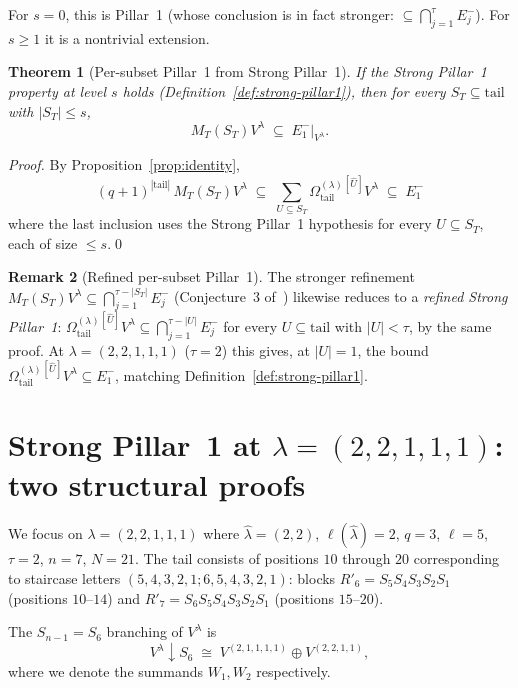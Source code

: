 \documentclass[11pt]{article}
\newtheorem{theorem}{Theorem}
\theoremstyle{definition}
\newtheorem{remark}[theorem]{Remark}
\newcommand{\Vlam}{V^\lambda}
\newcommand{\Om}{\Omega}
\newcommand{\Omtail}{\Om^{(\lambda)}_{\mathrm{tail}}}
\newcommand{\hatl}{\widehat\lambda}
\newcommand{\elh}{\ell(\hatl)}
\newcommand{\Rp}{R'}
\newcommand{\Eminus}[1]{E^-_{#1}}
\begin{document}
For $s = 0$, this is Pillar~1 (whose conclusion is in fact stronger:
$\subseteq \bigcap_{j=1}^\tau \Eminus j$). For $s \ge 1$ it is a
nontrivial extension.

\begin{theorem}[Per-subset Pillar~1 from Strong Pillar~1]\label{thm:per-subset-from-strong}
If the Strong Pillar~1 property at level $s$ holds (Definition~\ref{def:strong-pillar1}),
then for every $S_T \subseteq \mathrm{tail}$ with $|S_T| \le s$,
\[
   M_T(S_T) \Vlam \;\subseteq\; \Eminus 1|_{\Vlam}.
\]
\end{theorem}

\begin{proof}
By Proposition~\ref{prop:identity},
\[
   (q+1)^{|\mathrm{tail}|}\, M_T(S_T) \Vlam
   \;\subseteq\; \sum_{U \subseteq S_T} \Omtail^{[\widehat U]} \Vlam
   \;\subseteq\; \Eminus 1
\]
where the last inclusion uses the Strong Pillar~1 hypothesis for every
$U \subseteq S_T$, each of size $\le s$.\qed
\end{proof}

\begin{remark}[Refined per-subset Pillar~1]\label{rem:refined}
The stronger refinement
$M_T(S_T) \Vlam \subseteq \bigcap_{j=1}^{\tau-|S_T|}\Eminus j$
(Conjecture~3 of~\cite{strong}) likewise reduces to a \emph{refined Strong Pillar~1}:
$\Omtail^{[\widehat U]} \Vlam \subseteq \bigcap_{j=1}^{\tau-|U|}\Eminus j$
for every $U \subseteq \mathrm{tail}$ with $|U| < \tau$, by the same proof.
At $\lambda = (2,2,1,1,1)$ ($\tau = 2$) this gives, at $|U| = 1$, the bound
$\Omtail^{[\widehat U]} \Vlam \subseteq \Eminus 1$, matching
Definition~\ref{def:strong-pillar1}.
\end{remark}

\section{Strong Pillar~1 at $\lambda = (2,2,1,1,1)$: two structural proofs}
\label{sec:structural}

We focus on $\lambda = (2,2,1,1,1)$ where $\hatl = (2,2)$, $\elh = 2$, $q = 3$,
$\ell = 5$, $\tau = 2$, $n = 7$, $N = 21$. The tail consists of positions
$10$ through $20$ corresponding to staircase letters
$(5, 4, 3, 2, 1; 6, 5, 4, 3, 2, 1)$: blocks $\Rp_6 = S_5 S_4 S_3 S_2 S_1$
(positions $10$--$14$) and $\Rp_7 = S_6 S_5 S_4 S_3 S_2 S_1$ (positions
$15$--$20$).

The $S_{n-1} = S_6$ branching of $\Vlam$ is
\[
   \Vlam \downarrow S_6 \;\cong\; V^{(2,1,1,1,1)} \oplus V^{(2,2,1,1)},
\]
where we denote the summands $W_1, W_2$ respectively.
\end{document}

